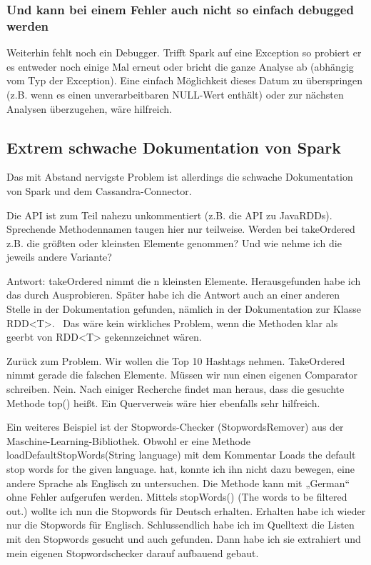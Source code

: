 \subsubsection{Und kann bei einem Fehler auch nicht
so einfach debugged werden}
Weiterhin fehlt noch ein Debugger. Trifft Spark auf eine Exception so
probiert er es entweder noch einige Mal erneut oder bricht die ganze
Analyse ab (abhängig vom Typ der Exception). Eine einfach Möglichkeit
dieses Datum zu überspringen (z.B. wenn es einen unverarbeitbaren
NULL-Wert enthält) oder zur nächsten Analysen überzugehen, wäre
hilfreich.

\subsection{Extrem schwache Dokumentation von Spark}
Das mit Abstand nervigste Problem ist allerdings die schwache
Dokumentation von Spark und dem Cassandra-Connector.

Die API ist zum Teil nahezu unkommentiert (z.B. die API zu JavaRDDs).
Sprechende Methodennamen taugen hier nur teilweise. Werden bei
takeOrdered z.B. die größten oder kleinsten Elemente genommen? Und wie
nehme ich die jeweils andere Variante?

Antwort: takeOrdered nimmt die n kleinsten Elemente. Herausgefunden habe
ich das durch Ausprobieren. Später habe ich die Antwort auch an einer
anderen Stelle in der Dokumentation gefunden, nämlich in der
Dokumentation zur Klasse RDD{\textless}T{\textgreater}. \ Das wäre kein
wirkliches Problem, wenn die Methoden klar als geerbt von
RDD{\textless}T{\textgreater} gekennzeichnet wären.

Zurück zum Problem. Wir wollen die Top 10 Hashtags nehmen. TakeOrdered
nimmt gerade die falschen Elemente. Müssen wir nun einen eigenen
Comparator schreiben. Nein. Nach einiger Recherche findet man heraus,
dass die gesuchte Methode top() heißt. Ein Querverweis wäre hier
ebenfalls sehr hilfreich.

Ein weiteres Beispiel ist der Stopwords-Checker (StopwordsRemover) aus
der Maschine-Learning-Bibliothek. Obwohl er eine Methode
loadDefaultStopWords(String language) mit dem Kommentar Loads the
default stop words for the given language. hat, konnte ich ihn nicht
dazu bewegen, eine andere Sprache als Englisch zu untersuchen. Die
Methode kann mit „German“ ohne Fehler aufgerufen werden. Mittels
stopWords() (The words to be filtered out.) wollte ich nun die
Stopwords für Deutsch erhalten. Erhalten habe ich wieder nur die
Stopwords für Englisch. Schlussendlich habe ich im Quelltext die Listen
mit den Stopwords gesucht und auch gefunden. Dann habe ich sie
extrahiert und mein eigenen Stopwordschecker darauf aufbauend gebaut.


